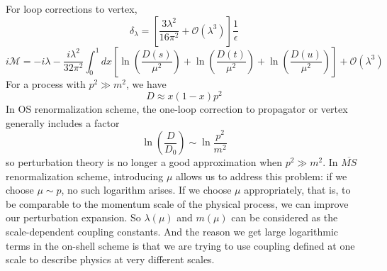 For loop corrections to vertex,
\[\delta_{\lambda} = \left[\frac{3\lambda^2}{16\pi^2} + \mathcal{O}(\lambda^3)\right]\frac{1}{\epsilon}\]
\[i\mathcal{M} = -i\lambda -\frac{i\lambda^2}{32\pi^2} \int_0^1 dx \left[\ln(\frac{D(s)}{\mu^2}) +\ln(\frac{D(t)}{\mu^2})+\ln(\frac{D(u)}{\mu^2})\right] + \mathcal{O}(\lambda^3)\]
For a process with $p^2 \gg m^2$, we have
\[ D \approx x(1-x)p^2\]
In OS renormalization scheme, the one-loop correction to propagator or vertex generally includes a factor
\[\ln \left( \frac{D}{D_0}\right ) \sim \ln \frac{p^2}{m^2}\]
so perturbation theory is no longer a good approximation when $p^2 \gg m^2$.
In $\overline{MS}$ renormalization scheme, introducing $\mu$ allows us to address this problem: if we choose $\mu \sim p$, no such logarithm arises. If we choose $\mu$ appropriately, that is, to be comparable to the momentum scale of the physical process, we can
improve our perturbation expansion. 
So $\lambda(\mu)$ and $m(\mu)$ can be considered as the scale-dependent coupling constants.
And the reason we get large logarithmic terms in the on-shell scheme is that we are trying to use coupling defined at one scale to describe physics at very different scales.

